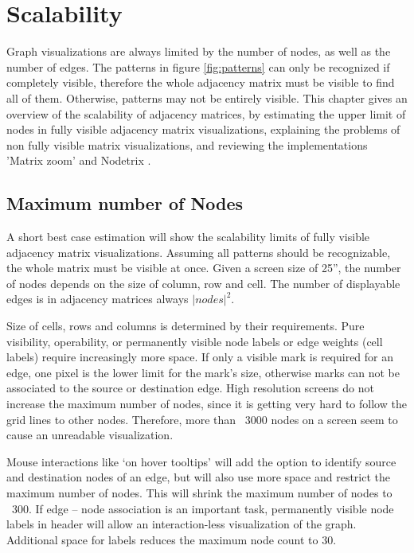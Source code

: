 \chapter{Scalability}
\label{chap:Scalability}

Graph visualizations are always limited by the number of nodes, as well as the number of edges. The patterns in figure \ref{fig:patterns} can only be recognized if completely visible, therefore the whole adjacency matrix must be visible to find all of them. Otherwise, patterns may not be entirely visible. This chapter gives an overview of the scalability of adjacency matrices, by estimating the upper limit of nodes in fully visible adjacency matrix visualizations, explaining the problems of non fully visible matrix visualizations, and reviewing the implementations 'Matrix zoom' \citep{ham-ivis-2003,abello2004} and Nodetrix \citep{henry-nodetrix-2007}.


\section{Maximum number of Nodes}
A short best case estimation will show the scalability limits of fully visible adjacency matrix visualizations. Assuming all patterns should be recognizable, the whole matrix must be visible at once. Given a screen size of 25”, the number of nodes depends on the size of column, row and cell. The number of displayable edges is in adjacency matrices always $|nodes|^2$.

Size of cells, rows and columns is determined by their requirements. Pure visibility, operability, or permanently visible node labels or edge weights (cell labels) require increasingly more space.
If only a visible mark is required for an edge, one pixel is the lower limit for the mark's size, otherwise marks can not be associated to the source or destination edge. High resolution screens do not increase the maximum number of nodes, since it is getting very hard to follow the grid lines to other nodes. Therefore, more than ~3000 nodes on a screen seem to cause an unreadable visualization.

Mouse interactions like ‘on hover tooltips’ will add the option to identify source and destination nodes of an edge, but will also use more space and restrict the maximum number of nodes. This will shrink the maximum number of nodes to ~300.
If edge -- node association is an important task, permanently visible node labels in header will allow an interaction-less visualization of the graph. Additional space for labels reduces the maximum node count to 30.
 
